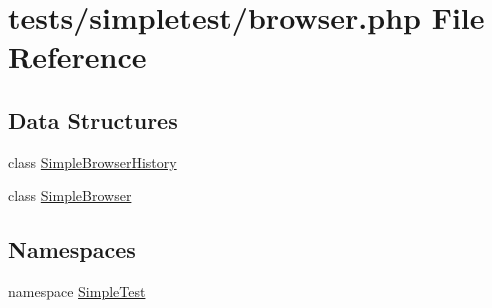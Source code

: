\hypertarget{browser_8php}{\section{tests/simpletest/browser.php File Reference}
\label{browser_8php}
}
\subsection*{Data Structures}
\begin{DoxyCompactItemize}
\item 
class \hyperlink{class_simple_browser_history}{Simple\-Browser\-History}
\item 
class \hyperlink{class_simple_browser}{Simple\-Browser}
\end{DoxyCompactItemize}
\subsection*{Namespaces}
\begin{DoxyCompactItemize}
\item 
namespace \hyperlink{namespace_simple_test}{Simple\-Test}
\end{DoxyCompactItemize}
